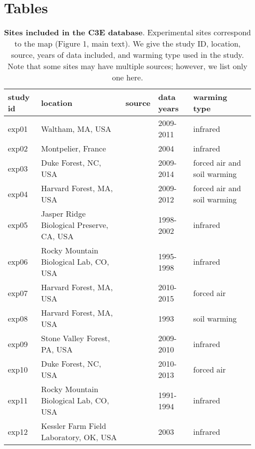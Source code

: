 \documentclass{article}
\begin{document}
\section* {Tables}
\begin{table}[b]
  \caption{\textbf{Sites included in the C3E database}. Experimental sites correspond to the map (Figure 1, main text). We give the study ID, location, source, years of data included, and warming type used in the study. Note that some sites may have multiple sources; however, we list only one here.}
\begin{footnotesize} 
   \begin{tabular}{| p{1.2cm} | p{5.7cm} | p{3.5cm} | p{1.5cm} | p{2cm} |}
    \hline
  study id & location & source & data years & warming type \\ \hline
    exp01 & Waltham, MA, USA & \cite{hoeppner2012} & 2009-2011 & infrared\\ \hline
    exp02 & Montpelier, France & \cite{morin2010} & 2004 & infrared\\ \hline
    exp03 & Duke Forest, NC, USA & \cite{clark2014a} & 2009-2014 & forced air and soil warming\\ \hline
    exp04 & Harvard Forest, MA, USA & \cite{clark2014a} & 2009-2012 & forced air and soil warming\\ \hline
    exp05 & Jasper Ridge Biological Preserve, CA, USA & \cite{cleland2007} & 1998-2002 & infrared\\ \hline
    exp06 & Rocky Mountain Biological Lab, CO, USA & \cite{dunne2003} & 1995-1998 & infrared\\ \hline
    exp07 & Harvard Forest, MA, USA & \cite{pelini2011} & 2010-2015 & forced air \\ \hline
    exp08 & Harvard Forest, MA, USA & \cite{farnsworth1995} & 1993 & soil warming \\ \hline
    exp09 & Stone Valley Forest, PA, USA & \cite{rollinson2012} & 2009-2010 & infrared \\ \hline
    exp10 & Duke Forest, NC, USA & \cite{marchin2015} & 2010-2013 & forced air \\ \hline
    exp11 & Rocky Mountain Biological Lab, CO, USA & \cite{price1998} & 1991-1994 & infrared\\ \hline
    exp12 & Kessler Farm Field Laboratory, OK, USA & \cite{sherry2007} & 2003 & infrared\\ \hline
     \end{tabular} 
    \end{footnotesize}  
    \end{table}
  
\end{document}

